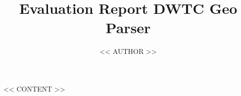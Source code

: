 \documentclass[11pt,oneside,a4paper]{article}
\begin{document}
\title{Evaluation Report DWTC Geo Parser}
\author{<< AUTHOR >>}

\maketitle



<< CONTENT >>
\end{document}

